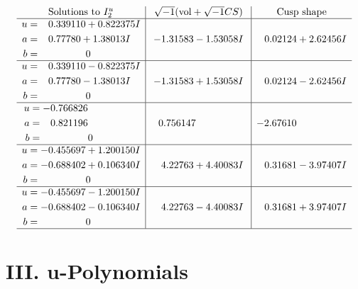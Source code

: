 \documentclass[1p]{elsarticle_modified}
\theoremstyle{definition}
\newcommand{\I}{\sqrt{-1}}
\begin{document}
$$\begin{array}{c|c|c}  
\text{Solutions to }I^u_{2}& \I (\text{vol} + \sqrt{-1}CS) & \text{Cusp shape}\\
 \hline 
\begin{aligned}
u &= \phantom{-}0.339110 + 0.822375 I \\
a &= \phantom{-}0.77780 + 1.38013 I \\
b &= \phantom{-0.000000 } 0\end{aligned}
 & -1.31583 - 1.53058 I & \phantom{-}0.02124 + 2.62456 I \\ \hline\begin{aligned}
u &= \phantom{-}0.339110 - 0.822375 I \\
a &= \phantom{-}0.77780 - 1.38013 I \\
b &= \phantom{-0.000000 } 0\end{aligned}
 & -1.31583 + 1.53058 I & \phantom{-}0.02124 - 2.62456 I \\ \hline\begin{aligned}
u &= -0.766826\phantom{ +0.000000I} \\
a &= \phantom{-}0.821196\phantom{ +0.000000I} \\
b &= \phantom{-0.000000 } 0\end{aligned}
 & \phantom{-}0.756147\phantom{ +0.000000I} & -2.67610\phantom{ +0.000000I} \\ \hline\begin{aligned}
u &= -0.455697 + 1.200150 I \\
a &= -0.688402 + 0.106340 I \\
b &= \phantom{-0.000000 } 0\end{aligned}
 & \phantom{-}4.22763 + 4.40083 I & \phantom{-}0.31681 - 3.97407 I \\ \hline\begin{aligned}
u &= -0.455697 - 1.200150 I \\
a &= -0.688402 - 0.106340 I \\
b &= \phantom{-0.000000 } 0\end{aligned}
 & \phantom{-}4.22763 - 4.40083 I & \phantom{-}0.31681 + 3.97407 I\\
 \hline 
 \end{array}$$\newpage
\newpage\renewcommand{\arraystretch}{1}
\centering \section*{ III. u-Polynomials}
\end{document}
